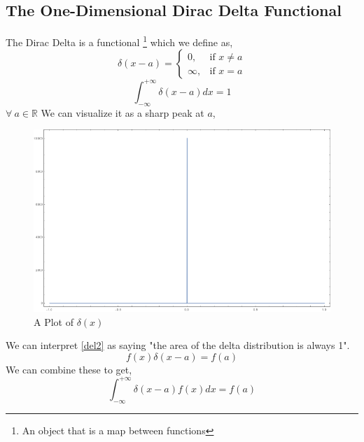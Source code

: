 \subsection{The One-Dimensional Dirac Delta Functional}
The Dirac Delta is a functional \footnote{An object that is a map between functions} which we define as,
\begin{equation} \label{deltadef}
\delta(x-a)= 
\begin{cases}
0, & \text{if } x \neq a\\
\infty,              & \text{if } x = a
\end{cases}
\end{equation}
\begin{equation}
\int_{- \infty}^{+ \infty} \delta(x-a) dx = 1
\label{del2}
\end{equation}
$\forall \  a \in \mathbb{R}$
We can visualize it as a sharp peak at $a$,
\begin{figure}
	\centering
	\includegraphics[scale=0.5]{Figures/delta-distribution.png}
	\caption{A Plot of $\delta(x)$}
\end{figure}
We can interpret \ref{del2} as saying "the area of the delta distribution is always 1".
\begin{equation}
f(x)\delta(x - a ) = f(a)
\end{equation}
We can combine these to get,
\begin{equation}
\int_{- \infty}^{+ \infty} \delta(x-a) f(x) dx = f(a)
\end{equation}
